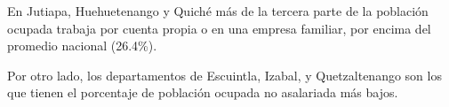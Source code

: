 En Jutiapa, Huehuetenango y  Quiché más de la tercera parte de la población ocupada trabaja por cuenta propia o en una empresa familiar, por encima del promedio nacional (26.4\%). 

Por otro lado,  los departamentos de Escuintla, Izabal,  y Quetzaltenango son los que tienen el porcentaje de población ocupada no asalariada más bajos. 